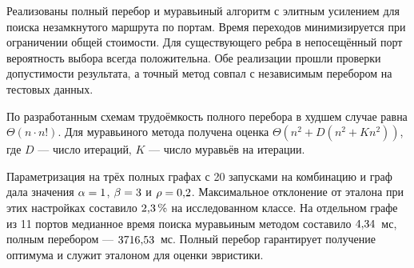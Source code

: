 
Реализованы полный перебор и муравьиный алгоритм с элитным усилением для поиска незамкнутого маршрута по портам. Время переходов минимизируется при ограничении общей стоимости. Для существующего ребра в непосещённый порт вероятность выбора всегда положительна. Обе реализации прошли проверки допустимости результата, а точный метод совпал с независимым перебором на тестовых данных.

По разработанным схемам трудоёмкость полного перебора в худшем случае равна $\Theta(n\cdot n!)$. Для муравьиного метода получена оценка $\Theta(n^2+D(n^2+Kn^2))$, где $D$ --- число итераций, $K$ --- число муравьёв на итерации.

Параметризация на трёх полных графах с 20 запусками на комбинацию и граф дала значения $\alpha=1$, $\beta=3$ и $\rho=0{,}2$. Максимальное отклонение от эталона при этих настройках составило $2{,}3\,\%$ на исследованном классе. На отдельном графе из 11 портов медианное время поиска муравьиным методом составило $4{,}34$~мс, полным перебором --- $3716{,}53$~мс. Полный перебор гарантирует получение оптимума и служит эталоном для оценки эвристики.
